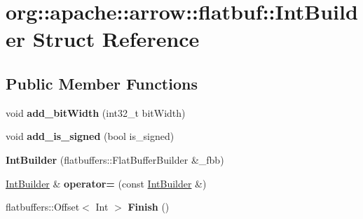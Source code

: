 \hypertarget{structorg_1_1apache_1_1arrow_1_1flatbuf_1_1IntBuilder}{}\section{org\+:\+:apache\+:\+:arrow\+:\+:flatbuf\+:\+:Int\+Builder Struct Reference}
\label{structorg_1_1apache_1_1arrow_1_1flatbuf_1_1IntBuilder}
\subsection*{Public Member Functions}
\begin{DoxyCompactItemize}
\item 
void {\bfseries add\+\_\+bit\+Width} (int32\+\_\+t bit\+Width)\hypertarget{structorg_1_1apache_1_1arrow_1_1flatbuf_1_1IntBuilder_accca607535bf07a66e16ec27fd835585}{}\label{structorg_1_1apache_1_1arrow_1_1flatbuf_1_1IntBuilder_accca607535bf07a66e16ec27fd835585}

\item 
void {\bfseries add\+\_\+is\+\_\+signed} (bool is\+\_\+signed)\hypertarget{structorg_1_1apache_1_1arrow_1_1flatbuf_1_1IntBuilder_aae8d3515a467ce6fc9dd90719d71b219}{}\label{structorg_1_1apache_1_1arrow_1_1flatbuf_1_1IntBuilder_aae8d3515a467ce6fc9dd90719d71b219}

\item 
{\bfseries Int\+Builder} (flatbuffers\+::\+Flat\+Buffer\+Builder \&\+\_\+fbb)\hypertarget{structorg_1_1apache_1_1arrow_1_1flatbuf_1_1IntBuilder_af7a5d1053aeb09b493627afa356e5845}{}\label{structorg_1_1apache_1_1arrow_1_1flatbuf_1_1IntBuilder_af7a5d1053aeb09b493627afa356e5845}

\item 
\hyperlink{structorg_1_1apache_1_1arrow_1_1flatbuf_1_1IntBuilder}{Int\+Builder} \& {\bfseries operator=} (const \hyperlink{structorg_1_1apache_1_1arrow_1_1flatbuf_1_1IntBuilder}{Int\+Builder} \&)\hypertarget{structorg_1_1apache_1_1arrow_1_1flatbuf_1_1IntBuilder_a50b1b628f306190f6feab10b2c29da3a}{}\label{structorg_1_1apache_1_1arrow_1_1flatbuf_1_1IntBuilder_a50b1b628f306190f6feab10b2c29da3a}

\item 
flatbuffers\+::\+Offset$<$ Int $>$ {\bfseries Finish} ()\hypertarget{structorg_1_1apache_1_1arrow_1_1flatbuf_1_1IntBuilder_a147ca5f6621fa4a90b66f9fd3aac9f41}{}\label{structorg_1_1apache_1_1arrow_1_1flatbuf_1_1IntBuilder_a147ca5f6621fa4a90b66f9fd3aac9f41}

\end{DoxyCompactItemize}
